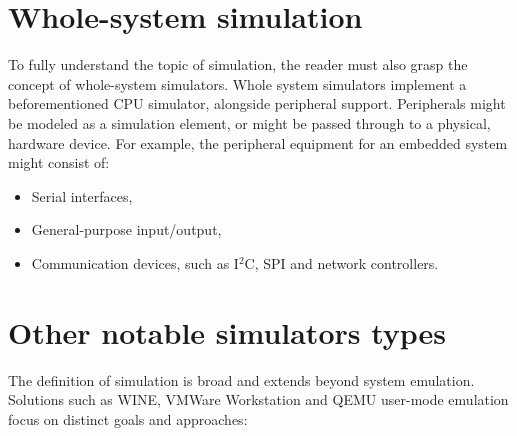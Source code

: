 \section{Whole-system simulation}

To fully understand the topic of simulation, the reader must also grasp the concept of whole-system simulators. Whole
system simulators implement a beforementioned CPU simulator, alongside peripheral support. Peripherals might be
modeled as a simulation element, or might be passed through to a physical, hardware device. For example, the peripheral
equipment for an embedded system might consist of:
\begin{itemize}
	\item{Serial interfaces,}
	\item{General-purpose input/output,}
	\item{Communication devices, such as I$^2$C, SPI and network controllers.}
\end{itemize}

\pagebreak
\section{Other notable simulators types}

The definition of simulation is broad and extends beyond system emulation. Solutions such as WINE, VMWare Workstation
and QEMU user-mode emulation focus on distinct goals and approaches:

